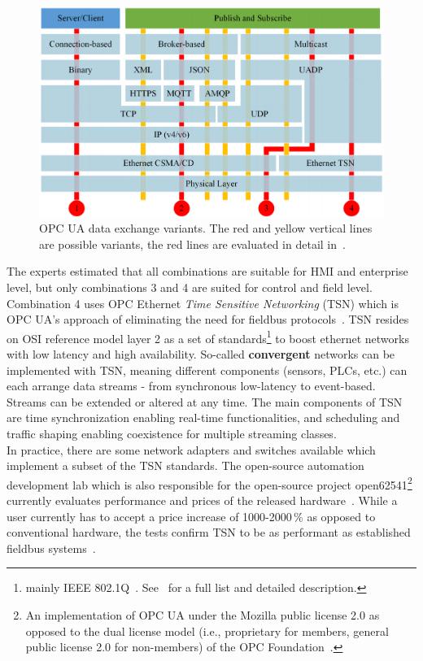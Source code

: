 \begin{figure}[ht]
    \centering
    \includegraphics[width=\textwidth]{img/OPC_UA_Data_Exchange.png}
    \caption{OPC UA data exchange variants. The red and yellow vertical lines are possible variants, the red lines are evaluated in detail in~\cite{Eckhardt2018AnCases}.}
    \label{fig:opc_ua_dataexchange}
\end{figure}

The experts estimated that all combinations are suitable for HMI and enterprise level, but only combinations 3 and 4 are suited for control and field level. Combination 4 uses OPC Ethernet \textit{Time Sensitive Networking} (TSN) which is OPC UA's approach of eliminating the need for fieldbus protocols~\cite{Wilmes2019ZauberwortKonvergenz}. TSN resides on OSI reference model layer 2 as a set of standards\footnote{mainly IEEE 802.1Q~\cite{2018IEEENetworks}. See~\cite{Bruckner2019AnSystems} for a full list and detailed description.} to boost ethernet networks with low latency and high availability. So-called \textbf{convergent} networks can be implemented with TSN, meaning different components (sensors, PLCs, etc.) can each arrange data streams - from synchronous low-latency to event-based. Streams can be extended or altered at any time. The main components of TSN are time synchronization enabling real-time functionalities, and scheduling and traffic shaping enabling coexistence for multiple streaming classes. \\
In practice, there are some network adapters and switches available which implement a subset of the TSN standards. The open-source automation development lab which is also responsible for the open-source project open62541\footnote{An implementation of OPC UA under the Mozilla public license 2.0 as opposed to the dual license model (i.e., proprietary for members, general public license 2.0 for non-members) of the OPC Foundation~\cite{Emde2019DieLizenzen}.} currently evaluates performance and prices of the released hardware~\cite{Emde2019DieLizenzen}. While a user currently has to accept a price increase of 1000-2000\,\% as opposed to conventional hardware, the tests confirm TSN to be as performant as established fieldbus systems~\cite{Emde2019DieLizenzen}.

